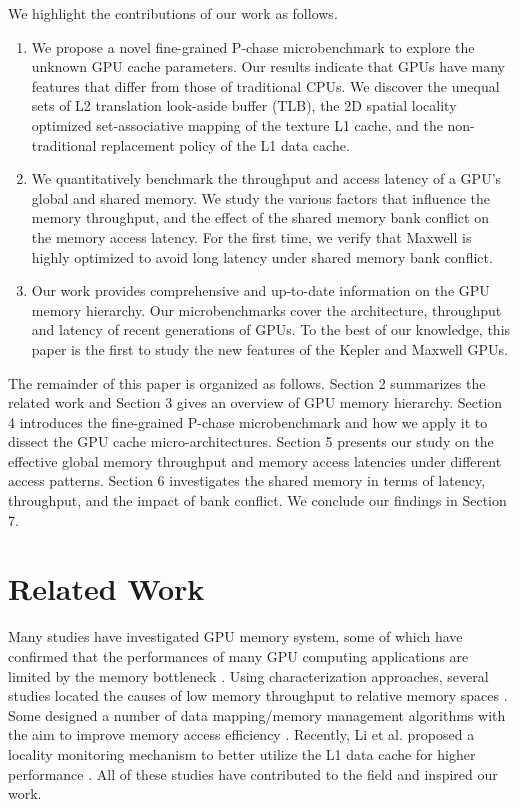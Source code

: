 \documentclass[10pt,journal,compsoc]{IEEEtran}
\theoremstyle{definition}
\begin{document}
We highlight the contributions of our work as follows.
\begin{enumerate}
  \item We propose a novel fine-grained P-chase microbenchmark to explore the unknown GPU cache parameters. Our results indicate that GPUs have many features that differ from those of traditional CPUs. We discover the unequal sets of L2 translation look-aside buffer (TLB), the 2D spatial locality optimized set-associative mapping of the texture L1 cache, and the non-traditional replacement policy of the L1 data cache.
  \item We quantitatively benchmark the throughput and access latency of a GPU's global and shared memory. We study the various factors that influence the memory throughput, and the effect of the shared memory bank conflict on the memory access latency. For the first time, we verify that Maxwell is highly optimized to avoid long latency under shared memory bank conflict.
  \item Our work provides comprehensive and up-to-date information on the GPU memory hierarchy. Our microbenchmarks cover the architecture, throughput and latency of recent generations of GPUs. To the best of our knowledge, this paper is the first to study the new features of the Kepler and Maxwell GPUs.
\end{enumerate}


The remainder of this paper is organized as follows. Section 2 summarizes the related work and Section 3 gives an overview of GPU memory hierarchy. Section 4 introduces the fine-grained P-chase microbenchmark and how we apply it to dissect the GPU cache micro-architectures. Section 5 presents our study on the effective global memory throughput and memory access latencies under different access patterns. Section 6 investigates the shared memory in terms of latency, throughput, and the impact of bank conflict. We conclude our findings in Section 7.


\section{Related Work}


Many studies have investigated GPU memory system, some of which have confirmed that the performances of many GPU computing applications are limited by the memory bottleneck \cite{ryoo2008optimization,Hwu20142574,keckler2011gpus,lal2014gpgpu}. Using characterization approaches, several studies located the causes of low memory throughput to relative memory spaces \cite{ryoo2008optimization,lal2014gpgpu,jia2012characterizing}. Some designed a number of data mapping/memory management algorithms with the aim to improve memory access efficiency \cite{jia2012characterizing,xie2013efficient,jang2011exploiting,Che2011Dymaxion,sung2010data}. Recently, Li et al. proposed a locality monitoring mechanism to better utilize the L1 data cache for higher performance \cite{li2015}. All of these studies have contributed to the field and inspired our work.
\end{document}
